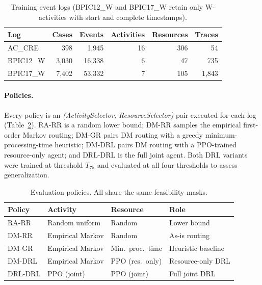 \documentclass[journal,onecolumn]{IEEEtran}
\begin{document}
\begin{table}[!ht]
\centering\scriptsize
\setlength{\tabcolsep}{4pt}
\begin{tabular}{lrrrrr}
\toprule
\textbf{Log} & \textbf{Cases} & \textbf{Events} &
\textbf{Activities} & \textbf{Resources} & \textbf{Traces} \\
\midrule
AC\_CRE   & 398     & 1{,}945  & 16 & 306 &     54 \\
BPIC12\_W & 3{,}030 & 16{,}338 &  6 &  47 &    735 \\
BPIC17\_W & 7{,}402 & 53{,}332 &  7 & 105 & 1{,}843 \\
\bottomrule
\end{tabular}
\caption[Training event logs]{Training event logs (BPIC12\_W and BPIC17\_W retain only
W-activities with start and complete timestamps).}
\label{tab:datasets}
\end{table}

\paragraph{Policies.}
Every policy is an \emph{(ActivitySelector, ResourceSelector)} pair
executed for each log (Table~\ref{tab:policies}).
RA-RR is a random lower bound; DM-RR samples the empirical
first-order Markov routing; DM-GR pairs DM routing with a greedy
minimum-processing-time heuristic; DM-DRL pairs DM routing with a
PPO-trained resource-only agent; and DRL-DRL is the full joint
agent. Both DRL variants were trained at threshold $T_{75}$ and
evaluated at all four thresholds to assess generalization.

\begin{table}[!ht]
\centering\scriptsize
\setlength{\tabcolsep}{3pt}
\begin{tabular}{llll}
\toprule
\textbf{Policy} & \textbf{Activity} & \textbf{Resource} &
\textbf{Role} \\
\midrule
RA-RR   & Random uniform   & Random             & Lower bound \\
DM-RR   & Empirical Markov & Random             & As-is routing \\
DM-GR   & Empirical Markov & Min.\ proc.\ time  & Heuristic baseline \\
DM-DRL  & Empirical Markov & PPO (res.\ only)   & Resource-only DRL \\
DRL-DRL & PPO (joint)      & PPO (joint)        & Full joint DRL \\
\bottomrule
\end{tabular}
\caption[Evaluation policies]{Evaluation policies. All share the same feasibility masks.}
\label{tab:policies}
\end{table}
\end{document}
